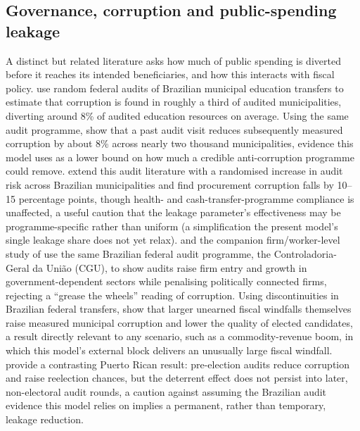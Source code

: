 \documentclass[11pt,a4paper]{article}
\begin{document}
\subsection{Governance, corruption and public-spending leakage}
\label{sec:lit-corruption}

A distinct but related literature asks how much of public spending is diverted before it reaches its intended beneficiaries, and how this interacts with fiscal policy. \citet{ferrazfinanmoreira2012} use random federal audits of Brazilian municipal education transfers to estimate that corruption is found in roughly a third of audited municipalities, diverting around 8\% of audited education resources on average. Using the same audit programme, \citet{avisferrazfinan2018} show that a past audit visit reduces subsequently measured corruption by about 8\% across nearly two thousand municipalities, evidence this model uses as a lower bound on how much a credible anti-corruption programme could remove. \citet{litschigzamboni2018} extend this audit literature with a randomised increase in audit risk across Brazilian municipalities and find procurement corruption falls by 10--15 percentage points, though health- and cash-transfer-programme compliance is unaffected, a useful caution that the leakage parameter's effectiveness may be programme-specific rather than uniform (a simplification the present model's single leakage share does not yet relax). \citet{colonnelliprem2022} and the companion firm/worker-level study of \citet{colonnellietal2022jfe} use the same Brazilian federal audit programme, the Controladoria-Geral da Uni\~ao (CGU), to show audits raise firm entry and growth in government-dependent sectors while penalising politically connected firms, rejecting a ``grease the wheels'' reading of corruption. Using discontinuities in Brazilian federal transfers, \citet{brollonanicciniperottitabellini2013} show that larger unearned fiscal windfalls themselves raise measured municipal corruption and lower the quality of elected candidates, a result directly relevant to any scenario, such as a commodity-revenue boom, in which this model's external block delivers an unusually large fiscal windfall. \citet{bobonisetal2016} provide a contrasting Puerto Rican result: pre-election audits reduce corruption and raise reelection chances, but the deterrent effect does not persist into later, non-electoral audit rounds, a caution against assuming the Brazilian audit evidence this model relies on implies a permanent, rather than temporary, leakage reduction.
\end{document}

